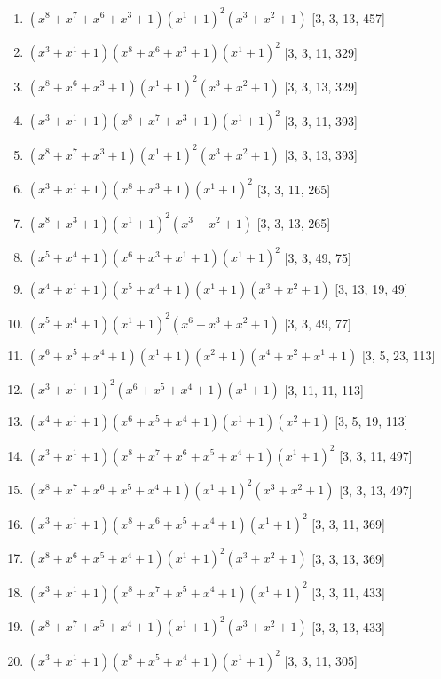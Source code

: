 \documentclass[10pt,twocolumn]{article}
\begin{document}
\begin{enumerate}
\item $(x^{8} + x^{7} + x^{6} + x^{3} + 1)(x^{1} + 1)^{2}(x^{3} + x^{2} + 1)$  [3, 3, 13, 457]
\item $(x^{3} + x^{1} + 1)(x^{8} + x^{6} + x^{3} + 1)(x^{1} + 1)^{2}$  [3, 3, 11, 329]
\item $(x^{8} + x^{6} + x^{3} + 1)(x^{1} + 1)^{2}(x^{3} + x^{2} + 1)$  [3, 3, 13, 329]
\item $(x^{3} + x^{1} + 1)(x^{8} + x^{7} + x^{3} + 1)(x^{1} + 1)^{2}$  [3, 3, 11, 393]
\item $(x^{8} + x^{7} + x^{3} + 1)(x^{1} + 1)^{2}(x^{3} + x^{2} + 1)$  [3, 3, 13, 393]
\item $(x^{3} + x^{1} + 1)(x^{8} + x^{3} + 1)(x^{1} + 1)^{2}$  [3, 3, 11, 265]
\item $(x^{8} + x^{3} + 1)(x^{1} + 1)^{2}(x^{3} + x^{2} + 1)$  [3, 3, 13, 265]
\item $(x^{5} + x^{4} + 1)(x^{6} + x^{3} + x^{1} + 1)(x^{1} + 1)^{2}$  [3, 3, 49, 75]
\item $(x^{4} + x^{1} + 1)(x^{5} + x^{4} + 1)(x^{1} + 1)(x^{3} + x^{2} + 1)$  [3, 13, 19, 49]
\item $(x^{5} + x^{4} + 1)(x^{1} + 1)^{2}(x^{6} + x^{3} + x^{2} + 1)$  [3, 3, 49, 77]
\item $(x^{6} + x^{5} + x^{4} + 1)(x^{1} + 1)(x^{2} + 1)(x^{4} + x^{2} + x^{1} + 1)$  [3, 5, 23, 113]
\item $(x^{3} + x^{1} + 1)^{2}(x^{6} + x^{5} + x^{4} + 1)(x^{1} + 1)$  [3, 11, 11, 113]
\item $(x^{4} + x^{1} + 1)(x^{6} + x^{5} + x^{4} + 1)(x^{1} + 1)(x^{2} + 1)$  [3, 5, 19, 113]
\item $(x^{3} + x^{1} + 1)(x^{8} + x^{7} + x^{6} + x^{5} + x^{4} + 1)(x^{1} + 1)^{2}$  [3, 3, 11, 497]
\item $(x^{8} + x^{7} + x^{6} + x^{5} + x^{4} + 1)(x^{1} + 1)^{2}(x^{3} + x^{2} + 1)$  [3, 3, 13, 497]
\item $(x^{3} + x^{1} + 1)(x^{8} + x^{6} + x^{5} + x^{4} + 1)(x^{1} + 1)^{2}$  [3, 3, 11, 369]
\item $(x^{8} + x^{6} + x^{5} + x^{4} + 1)(x^{1} + 1)^{2}(x^{3} + x^{2} + 1)$  [3, 3, 13, 369]
\item $(x^{3} + x^{1} + 1)(x^{8} + x^{7} + x^{5} + x^{4} + 1)(x^{1} + 1)^{2}$  [3, 3, 11, 433]
\item $(x^{8} + x^{7} + x^{5} + x^{4} + 1)(x^{1} + 1)^{2}(x^{3} + x^{2} + 1)$  [3, 3, 13, 433]
\item $(x^{3} + x^{1} + 1)(x^{8} + x^{5} + x^{4} + 1)(x^{1} + 1)^{2}$  [3, 3, 11, 305]

\end{enumerate}
\end{document}
